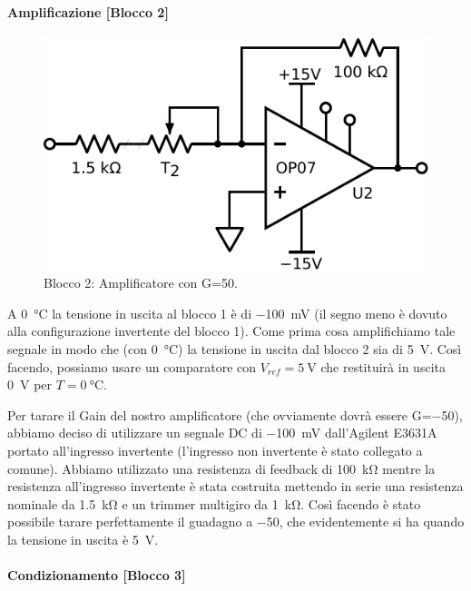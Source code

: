 \paragraph{Amplificazione [Blocco 2]\newline}

\begin{figure}
\centering
\includegraphics[width=.3\textwidth]{../E06/latex/P2.pdf}
\caption{Blocco 2: Amplificatore con G=50.}
\label{cir6:2wire}
\end{figure}

A \SI{0}{\celsius} la tensione in uscita al blocco 1 è di \SI{-100}{\mV} (il segno meno è dovuto alla configurazione invertente del blocco 1).
Come prima cosa amplifichiamo tale segnale in modo che (con \SI{0}{\celsius}) la tensione in uscita dal blocco 2 sia di \SI{5}{\volt}.
Così facendo, possiamo usare un comparatore con $V_{ref}=\SI{5}{\volt}$ che restituirà in uscita \SI{0}{\volt} per $T=\SI{0}{\celsius}$.

Per tarare il Gain del nostro amplificatore (che ovviamente dovrà essere G=\num{-50}), abbiamo deciso di utilizzare un segnale DC di \SI{-100}{\mV} dall'Agilent E3631A portato all'ingresso invertente (l'ingresso non invertente è stato collegato a comune).
Abbiamo utilizzato una resistenza di feedback di \SI{100}{\kilo\ohm} mentre la resistenza all'ingresso invertente è stata costruita mettendo in serie una resistenza nominale da \SI{1.5}{\kilo\ohm} e un trimmer multigiro da \SI{1}{\kilo\ohm}.
Così facendo è stato possibile tarare perfettamente il guadagno a \num{-50}, che evidentemente si ha quando la tensione in uscita è \SI{5}{\volt}. 

\paragraph{Condizionamento [Blocco 3]\newline}

